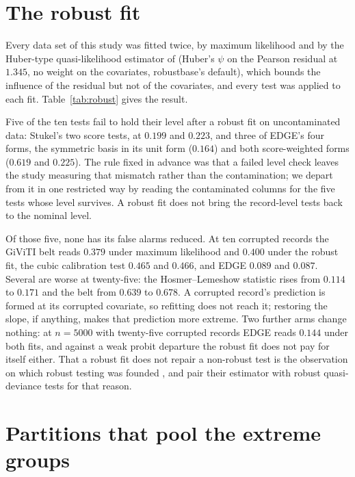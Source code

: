 \documentclass[11pt]{article}
\begin{document}


\section{The robust fit}\label{si:robust}

Every data set of this study was fitted twice, by maximum likelihood and by the Huber-type
quasi-likelihood estimator of \citet{cantoni2001robust} (Huber's $\psi$ on the Pearson residual at
$1.345$, no weight on the covariates, \textsf{robustbase}'s default), which bounds the influence of the
residual but not of the covariates, and every
test was applied to each fit. Table~\ref{tab:robust} gives the result.

Five of the ten tests fail to hold their level after a robust fit on uncontaminated data: Stukel's two
score tests, at $0.199$ and $0.223$, and three of EDGE's four forms, the symmetric basis
in its unit form ($0.164$) and both score-weighted forms ($0.619$ and $0.225$). The rule fixed in
advance was that a failed level check leaves the study measuring that mismatch rather than the
contamination; we depart from it in one restricted way by reading the contaminated columns for the five
tests whose level survives. A robust fit does not bring the record-level tests back to the nominal
level.

Of those five, none has its false alarms reduced. At ten corrupted records the GiViTI belt reads $0.379$
under maximum likelihood and $0.400$ under the robust fit, the cubic calibration test $0.465$ and
$0.466$, and EDGE $0.089$ and $0.087$. Several are worse at twenty-five: the
Hosmer--Lemeshow statistic rises from $0.114$ to $0.171$ and the belt from $0.639$ to $0.678$.
A corrupted record's prediction is formed at its corrupted covariate, so refitting does not reach it;
restoring the slope, if anything, makes that prediction more extreme. Two further arms change nothing: at $n=5000$ with twenty-five corrupted
records EDGE reads $0.144$ under both fits, and against a weak probit departure the
robust fit does not pay for itself either. That a robust fit does not repair a non-robust test is the
observation on which robust testing was founded \citep{hampel1986robust,heritier1994robust}, and
\citet{cantoni2001robust} pair their estimator with robust quasi-deviance tests for that reason.



\section{Partitions that pool the extreme groups}\label{si:remedies}
\end{document}
